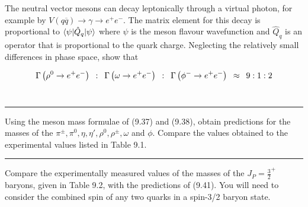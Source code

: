 \begin{problem}{9.5}
The neutral vector mesons can decay leptonically through a virtual photon, for example by $V(q\overbar{q}) \to \gamma \to e^+e^-$. The matrix element for this decay is proportional to $\braket{\psi|\hat{Q}_q|\psi}$ where $\psi$ is the meson flavour wavefunction and $\hat{Q}_q$ is an operator that is proportional to the quark charge. Neglecting the relatively small differences in phase space, show that

\begin{align*}
    \Gamma \left( \rho^0 \to e^+e^- \right) \hskip0.5em\relax  : \hskip0.5em\relax   \Gamma \left( \omega \to  e^+e^- \right) \hskip0.5em\relax : \hskip0.5em\relax   \Gamma \left( \phi^- \to e^+e^- \right) \hskip0.5em\relax \approx \hskip0.5em\relax 9:1:2
\end{align*}\\
\end{problem}
\begin{solution}

\end{solution}

\noindent\rule{7in}{1.5pt}


\begin{problem}{9.6}
Using the meson mass formulae of (9.37) and (9.38), obtain predictions for the masses of the $\pi^\pm , \pi^0 , \eta , \eta' , \rho^0 , \rho^\pm , \omega$ and $\phi$. Compare the values obtained to the experimental values listed in Table 9.1.
\end{problem}
\begin{solution}

\end{solution}

\noindent\rule{7in}{1.5pt}


\begin{problem}{9.7}
Compare the experimentally measured values of the masses of the $J_P = \frac{3}{2}^+ $ baryons, given in Table 9.2, with the predictions of (9.41). You will need to consider the combined spin of any two quarks in a spin-3/2 baryon state.
\end{problem}
\begin{solution}

\end{solution}

